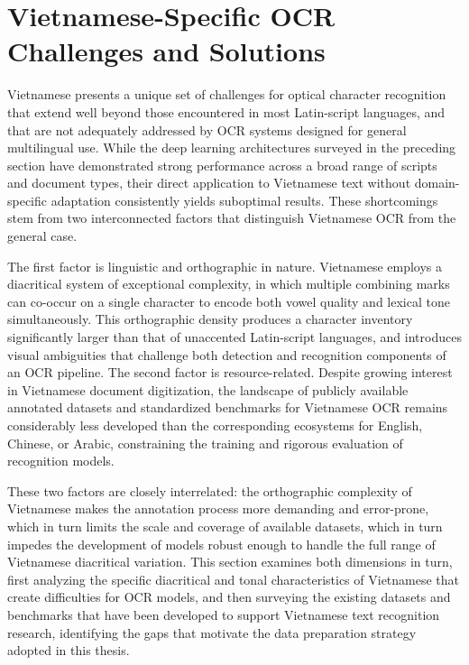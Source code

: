 \section{Vietnamese-Specific OCR Challenges and Solutions}
Vietnamese presents a unique set of challenges for optical character recognition that extend well beyond those encountered in most Latin-script languages, and that are not adequately addressed by OCR systems designed for general multilingual use. While the deep learning architectures surveyed in the preceding section have demonstrated strong performance across a broad range of scripts and document types, their direct application to Vietnamese text without domain-specific adaptation consistently yields suboptimal results. These shortcomings stem from two interconnected factors that distinguish Vietnamese OCR from the general case.

The first factor is linguistic and orthographic in nature. Vietnamese employs a diacritical system of exceptional complexity, in which multiple combining marks can co-occur on a single character to encode both vowel quality and lexical tone simultaneously. This orthographic density produces a character inventory significantly larger than that of unaccented Latin-script languages, and introduces visual ambiguities that challenge both detection and recognition components of an OCR pipeline. The second factor is resource-related. Despite growing interest in Vietnamese document digitization, the landscape of publicly available annotated datasets and standardized benchmarks for Vietnamese OCR remains considerably less developed than the corresponding ecosystems for English, Chinese, or Arabic, constraining the training and rigorous evaluation of recognition models.

These two factors are closely interrelated: the orthographic complexity of Vietnamese makes the annotation process more demanding and error-prone, which in turn limits the scale and coverage of available datasets, which in turn impedes the development of models robust enough to handle the full range of Vietnamese diacritical variation. This section examines both dimensions in turn, first analyzing the specific diacritical and tonal characteristics of Vietnamese that create difficulties for OCR models, and then surveying the existing datasets and benchmarks that have been developed to support Vietnamese text recognition research, identifying the gaps that motivate the data preparation strategy adopted in this thesis.


